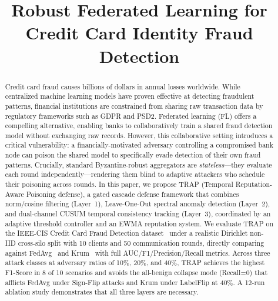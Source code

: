 \documentclass[journal]{IEEEtran}
\newcommand{\sysname}{TRAP}
\begin{document}
\title{Robust Federated Learning for Credit Card Identity Fraud Detection}

\author{%
}

\maketitle

\begin{abstract}
Credit card fraud causes billions of dollars in annual losses worldwide.
While centralized machine learning models have proven effective at detecting
fraudulent patterns, financial institutions are constrained from sharing raw
transaction data by regulatory frameworks such as GDPR and PSD2.
Federated learning (FL) offers a compelling alternative, enabling banks to
collaboratively train a shared fraud detection model without exchanging raw
records. However, this collaborative setting introduces a critical
vulnerability: a financially-motivated adversary controlling a compromised
bank node can poison the shared model to specifically evade detection of
their own fraud patterns. Crucially, standard Byzantine-robust aggregators
are \emph{stateless}---they evaluate each round independently---rendering
them blind to adaptive attackers who schedule their poisoning across rounds.
In this paper, we propose \sysname{} (Temporal Reputation-Aware Poisoning
defense), a gated cascade defense framework that combines norm/cosine
filtering (Layer~1), Leave-One-Out spectral anomaly detection (Layer~2),
and dual-channel CUSUM temporal consistency tracking (Layer~3), coordinated
by an adaptive threshold controller and an EWMA reputation system.
We evaluate \sysname{} on the IEEE-CIS Credit Card Fraud Detection
dataset~\cite{kaggle2019ieeecis} under a realistic Dirichlet non-IID
cross-silo split with 10 clients and 50 communication rounds, directly
comparing against FedAvg~\cite{mcmahan2017fedavg} and
Krum~\cite{blanchard2017krum} with full AUC/F1/Precision/Recall metrics.
Across three attack classes at adversary ratios of 10\%, 20\%, and 40\%,
\sysname{} achieves the highest F1-Score in 8 of 10 scenarios and avoids
the all-benign collapse mode (Recall=0) that afflicts FedAvg under
Sign-Flip attacks and Krum under LabelFlip at 40\%.
A 12-run ablation study demonstrates that all three layers are necessary.
\end{abstract}
\end{document}
